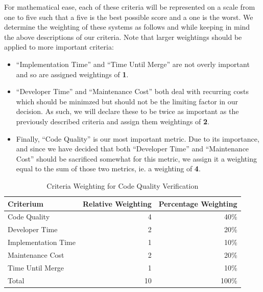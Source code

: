 \documentclass[12pt]{article}
\begin{document}
For mathematical ease, each of these criteria will be represented on a scale from one to five such that a five is the best possible score and a one is the worst. We determine the weighting of these systems as follows and while keeping in mind the above descriptions of our criteria. Note that larger weightings should be applied to more important criteria:
\begin{itemize}
\item ``Implementation Time'' and ``Time Until Merge'' are not overly important and so are assigned weightings of {\bf 1}.
\item ``Developer Time'' and ``Maintenance Cost'' both deal with recurring costs which should be minimzed but should not be the limiting factor in our decision. As such, we will declare these to be twice as important as the previously described criteria and assign them weightings of {\bf 2}.
\item Finally, ``Code Quality'' is our most important metric. Due to its importance, and since we have decided that both ``Developer Time'' and ``Maintenance Cost'' should be sacrificed somewhat for this metric, we assign it a weighting equal to the sum of those two metrics, ie. a weighting of {\bf 4}.
\end{itemize}

\begin{table}[ht]
\caption{Criteria Weighting for Code Quality Verification}
\label{tbl:weighting-cqv}
\centering
\begin{tabular}{|l|r|r|}
    \hline
    Criterium & Relative Weighting & Percentage Weighting \\
    \hline
    \hline
    Code Quality        &  4 &  40\% \\
    Developer Time      &  2 &  20\% \\
    Implementation Time &  1 &  10\% \\
    Maintenance Cost    &  2 &  20\% \\
    Time Until Merge    &  1 &  10\% \\
    \hline
    \hline
    Total               & 10 & 100\% \\
    \hline
\end{tabular}
\end{table}
\end{document}
